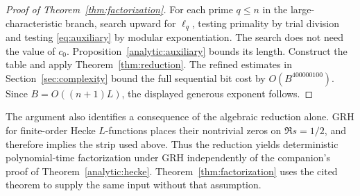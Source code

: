 \begin{proof}[Proof of Theorem~\ref{thm:factorization}]
For each prime $q\le n$ in the large-characteristic branch, search
upward for $\ell_q$, testing primality by trial division and testing
\eqref{eq:auxiliary} by modular exponentiation. The search does not
need the value of $c_0$. Proposition~\ref{analytic:auxiliary} bounds
its length. Construct the table and apply
Theorem~\ref{thm:reduction}. The refined estimates in
Section~\ref{sec:complexity} bound the full sequential bit cost by
$O(B^{400000100})$.
Since $B=O((n+1)L)$, the displayed generous exponent follows.
\end{proof}

The argument also identifies a consequence of the algebraic reduction
alone. GRH for finite-order Hecke $L$-functions places their nontrivial
zeros on $\Re s=1/2$, and therefore implies the strip used above.
Thus the reduction yields deterministic polynomial-time factorization
under GRH independently of the companion's proof of
Theorem~\ref{analytic:hecke}. Theorem~\ref{thm:factorization} uses the
cited theorem to supply the same input without that assumption.
